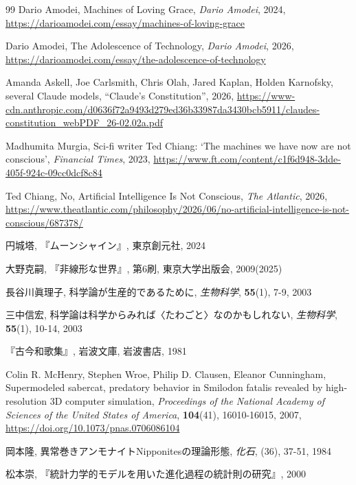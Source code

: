 \documentclass[10pt, a5paper, twoside]{ltjsarticle}
\begin{document}
\begin{thebibliography}{99}
         Dario Amodei, Machines of Loving Grace, \textit{Dario Amodei}, 2024, \url{https://darioamodei.com/essay/machines-of-loving-grace}

         Dario Amodei, The Adolescence of Technology, \textit{Dario Amodei}, 2026, \url{https://darioamodei.com/essay/the-adolescence-of-technology}

         Amanda Askell, Joe Carlsmith, Chris Olah, Jared Kaplan, Holden Karnofsky, several Claude models, ``Claude's Constitution'', 2026, \url{https://www-cdn.anthropic.com/d0636f72a9493d279ed36b33987da3430bcb5911/claudes-constitution_webPDF_26-02.02a.pdf}

         Madhumita Murgia, Sci-fi writer Ted Chiang: `The machines we have now are not conscious', \textit{Financial Times}, 2023, \url{https://www.ft.com/content/c1f6d948-3dde-405f-924c-09cc0dcf8c84}

         Ted Chiang, No, Artificial Intelligence Is Not Conscious, \textit{The Atlantic}, 2026, \url{https://www.theatlantic.com/philosophy/2026/06/no-artificial-intelligence-is-not-conscious/687378/}

         円城塔, 『ムーンシャイン』, 東京創元社, 2024

         大野克嗣, 『非線形な世界』, 第6刷, 東京大学出版会, 2009(2025)

         長谷川眞理子, 科学論が生産的であるために, \textit{生物科学}, \textbf{55}(1), 7-9, 2003

         三中信宏, 科学論は科学からみれば〈たわごと〉なのかもしれない, \textit{生物科学}, \textbf{55}(1), 10-14, 2003

         『古今和歌集』, 岩波文庫, 岩波書店, 1981

         Colin R. McHenry, Stephen Wroe, Philip D. Clausen, Eleanor Cunningham, Supermodeled sabercat, predatory behavior in Smilodon fatalis revealed by high-resolution 3D computer simulation, \textit{Proceedings of the National Academy of Sciences of the United States of America}, \textbf{104}(41), 16010-16015, 2007, \url{https://doi.org/10.1073/pnas.0706086104}

         岡本隆, 異常巻きアンモナイトNipponitesの理論形態, \textit{化石}, (36), 37-51, 1984

         松本崇, 『統計力学的モデルを用いた進化過程の統計則の研究』, 2000


\end{thebibliography}
\end{document}
